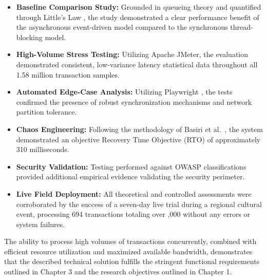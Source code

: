 \begin{itemize}
    \item \textbf{Baseline Comparison Study:} Grounded in queueing theory \cite{kleinrock1975} and quantified through Little's Law \cite{little1961}, the study demonstrated a clear performance benefit of the asynchronous event-driven model compared to the synchronous thread-blocking model.
    \item \textbf{High-Volume Stress Testing:} Utilizing Apache JMeter, the evaluation demonstrated consistent, low-variance latency statistical data throughout all 1.58 million transaction samples.
    \item \textbf{Automated Edge-Case Analysis:} Utilizing Playwright \cite{playwright2024}, the tests confirmed the presence of robust synchronization mechanisms and network partition tolerance.
    \item \textbf{Chaos Engineering:} Following the methodology of Basiri et al.\ \cite{basiri2016chaos}, the system demonstrated an objective Recovery Time Objective (RTO) of approximately 310 milliseconds.
    \item \textbf{Security Validation:} Testing performed against OWASP classifications \cite{owasp2025} provided additional empirical evidence validating the security perimeter.
    \item \textbf{Live Field Deployment:} All theoretical and controlled assessments were corroborated by the success of a seven-day live trial during a regional cultural event, processing 694 transactions totaling over ,000 without any errors or system failures.
\end{itemize}

The ability to process high volumes of transactions concurrently, combined with efficient resource utilization and maximized available bandwidth, demonstrates that the described technical solution fulfills the stringent functional requirements outlined in Chapter 3 and the research objectives outlined in Chapter 1.
